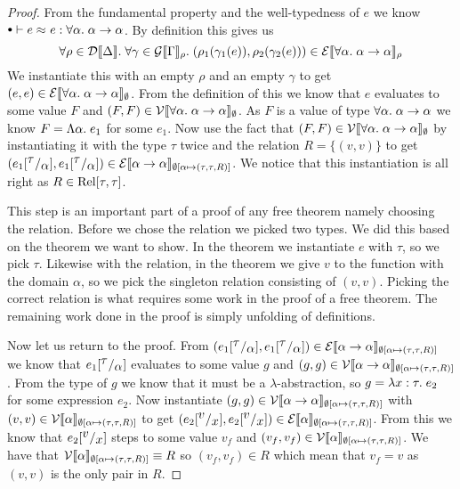 \begin{proof}
\newcommand{\aaa}{\ensuremath{\forall \alpha. \; \tarrow{\alpha}{\alpha}}}
From the fundamental property and the well-typedness of $e$ we know $\mtenv \vdash \lreq{e}{e} : \aaa$. By definition this gives us
\[
\forall \rho \in \dpred{\Delta}. \; \forall \gamma \in \gprep{\Gamma}. \; (\rho_1(\gamma_1(e)),\rho_2(\gamma_2(e))) \in \eprep{\aaa}
\]
\newcommand{\mt}{\ensuremath{\emptyset}}
We instantiate this with an empty $\rho$ and an empty $\gamma$ to get $(e,e) \in \eprep[\mt]{\aaa}$. From the definition of this we know that $e$ evaluates to some value $F$ and $(F,F) \in \vprep[\mt]{\aaa}$. As $F$ is a value of type \aaa{} we know $F=\Lambda \alpha . \; e_1$ for some $e_1$. Now use the fact that $(F,F) \in \vprep[\mt]{\aaa}$ by instantiating it with the type $\tau$ twice and the relation $R=\{(v,v)\}$ to get 
\newcommand{\env}{\ensuremath{\extsub{\mt}{\alpha}{(\tau,\tau,R)}}}
\newcommand{\taa}{\ensuremath{\tarrow{\alpha}{\alpha}}}
$(\subst{e_1}{\tau}{\alpha},\subst{e_1}{\tau}{\alpha})\in \eprep[\env]{\taa}$. We notice that this instantiation is all right as $R \in \operatorname{Rel}[\tau,\tau]$.

This step is an important part of a proof of any free theorem namely choosing the relation. Before we chose the relation we picked two types. We did this based on the theorem we want to show. In the theorem we instantiate $e$ with $\tau$, so we pick $\tau$. Likewise with the relation, in the theorem we give $v$ to the function with the domain $\alpha$, so we pick the singleton relation consisting of $(v,v)$. Picking the correct relation is what requires some work in the proof of a free theorem. The remaining work done in the proof is simply unfolding of definitions.

Now let us return to the proof. From $(\subst{e_1}{\tau}{\alpha},\subst{e_1}{\tau}{\alpha})\in \eprep[\env]{\taa}$ we know that $e_1[^{\textstyle \tau}/_{\textstyle \alpha}]$ evaluates to some value $g$ and $(g,g)\in \vprep[\env]{\taa}$. From the type of $g$ we know that it must be a $\lambda$-abstraction, so $g=\lambda x : \tau . \; e_2$ for some expression $e_2$. Now instantiate $(g,g)\in \vprep[\env]{\taa}$ with $(v,v) \in \vprep[\env]{\alpha}$ to get $(\subst{e_2}{v}{x},\subst{e_2}{v}{x}) \in \eprep[\env]{\alpha}$. From this we know that $e_2[^{\textstyle v}/_{\textstyle x}]$ steps to some value $v_f$ and $(v_f,v_f) \in \vprep[\env]{\alpha}$. We have that $\vprep[\env]{\alpha} \equiv R$ so $(v_f,v_f) \in R$ which mean that $v_f = v$ as $(v,v)$ is the only pair in $R$.


\end{proof}

